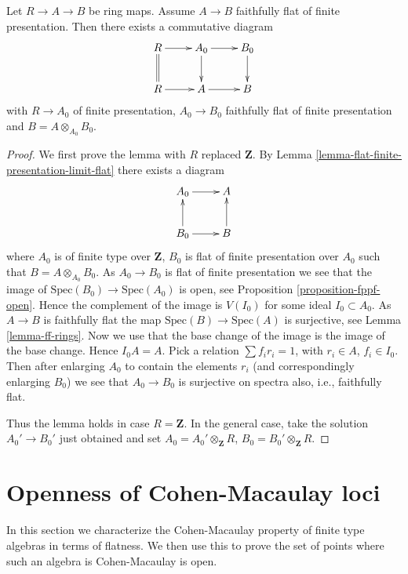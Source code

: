 \begin{lemma}
\label{lemma-descend-faithfully-flat-finite-presentation}
Let $R \to A \to B$ be ring maps.
Assume $A \to B$ faithfully flat of finite presentation.
Then there exists a commutative diagram
$$
\xymatrix{
R \ar[r] \ar@{=}[d] &
A_0 \ar[d] \ar[r] &
B_0 \ar[d] \\
R \ar[r] & A \ar[r] & B
}
$$
with $R \to A_0$ of finite presentation,
$A_0 \to B_0$ faithfully flat of finite presentation
and $B = A \otimes_{A_0} B_0$.
\end{lemma}

\begin{proof}
We first prove the lemma with $R$ replaced $\mathbf{Z}$.
By Lemma \ref{lemma-flat-finite-presentation-limit-flat}
there exists a diagram
$$
\xymatrix{
A_0 \ar[r] & A \\
B_0 \ar[u] \ar[r] & B \ar[u]
}
$$
where $A_0$ is of finite type over $\mathbf{Z}$, $B_0$ is flat of finite
presentation over $A_0$ such that $B = A \otimes_{A_0} B_0$.
As $A_0 \to B_0$ is flat of finite presentation we see that the image of
$\text{Spec}(B_0) \to \text{Spec}(A_0)$ is open, see
Proposition \ref{proposition-fppf-open}. Hence the complement of the image
is $V(I_0)$ for some ideal $I_0 \subset A_0$.
As $A \to B$ is faithfully
flat the map $\text{Spec}(B) \to \text{Spec}(A)$ is surjective, see
Lemma \ref{lemma-ff-rings}.
Now we use that
the base change of the image is the image of the base change.
Hence $I_0A = A$. Pick a relation
$\sum f_i r_i = 1$, with $r_i \in A$, $f_i \in I_0$. Then after
enlarging $A_0$ to contain the elements $r_i$ (and correspondingly
enlarging $B_0$) we see that $A_0 \to B_0$ is surjective on spectra
also, i.e., faithfully flat.

\medskip\noindent
Thus the lemma holds in case $R = \mathbf{Z}$.
In the general case, take the solution $A_0' \to B_0'$
just obtained and set $A_0 = A_0' \otimes_{\mathbf{Z}} R$,
$B_0 = B_0' \otimes_{\mathbf{Z}} R$.
\end{proof}



\section{Openness of Cohen-Macaulay loci}
\label{section-CM-open}

\noindent
In this section we characterize the Cohen-Macaulay property
of finite type algebras in terms of flatness. We then use this
to prove the set of points where such an algebra is Cohen-Macaulay
is open.

